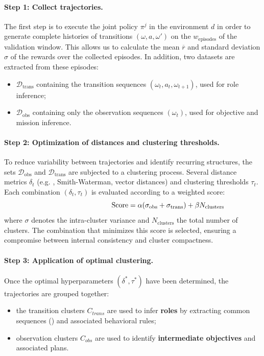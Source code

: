 \paragraph{Step 1: Collect trajectories.}
The first step is to execute the joint policy $\pi^j$ in the environment $d$ in order to generate complete histories of transitions $(\omega, a, \omega')$ on the $w_{\text{episodes}}$ of the validation window. This allows us to calculate the mean $\overline{r}$ and standard deviation $\sigma$ of the rewards over the collected episodes.
In addition, two datasets are extracted from these episodes:
\begin{itemize}
  \item $\mathcal{D}_{\text{trans}}$ containing the transition sequences $(\omega_t, a_t, \omega_{t+1})$, used for role inference;
  \item $\mathcal{D}_{\text{obs}}$ containing only the observation sequences $(\omega_t)$, used for objective and mission inference.
\end{itemize}

\paragraph{Step 2: Optimization of distances and clustering thresholds.}
To reduce variability between trajectories and identify recurring structures, the sets $\mathcal{D}_{\text{obs}}$ and $\mathcal{D}_{\text{trans}}$ are subjected to a clustering process.
Several distance metrics $\delta_t$ (e.g. , Smith-Waterman, vector distances) and clustering thresholds $\tau_t$.
Each combination $(\delta_t, \tau_t)$ is evaluated according to a weighted score:
\[
  \hspace{3.5cm}\text{Score} = \alpha (\sigma_{\text{obs}} + \sigma_{\text{trans}}) + \beta N_{\text{clusters}}
\]
where $\sigma$ denotes the intra-cluster variance and $N_{\text{clusters}}$ the total number of clusters.
The combination that minimizes this score is selected, ensuring a compromise between internal consistency and cluster compactness.

\paragraph{Step 3: Application of optimal clustering.}
Once the optimal hyperparameters $(\delta^*, \tau^*)$ have been determined, the trajectories are grouped together:
\begin{itemize}
  \item the transition clusters $C_{trans}$ are used to infer \textbf{roles} by extracting common sequences () and associated behavioral rules;
  \item observation clusters $C_{obs}$ are used to identify \textbf{intermediate objectives} and associated plans.
\end{itemize}

